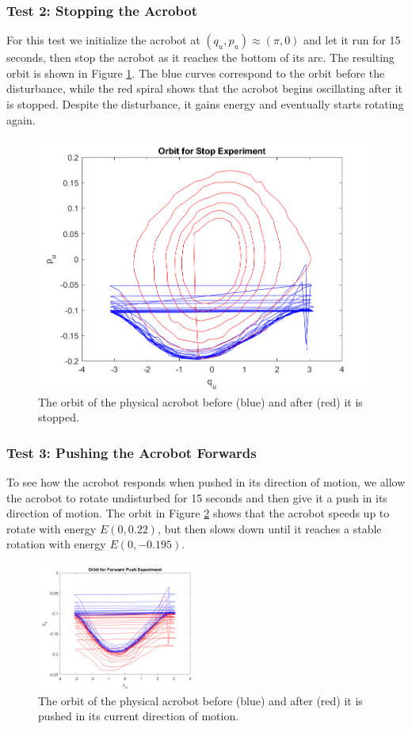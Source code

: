\subsubsection*{Test 2: Stopping the Acrobot}
For this test we initialize the acrobot at 
\((q_u,p_u) \approx \left(\pi,0\right)\) and let it run for 15
seconds, then stop the acrobot as it reaches the bottom of its arc.
The resulting orbit is shown in Figure \ref{fig:acrobot-stopped-orbit}.
The blue curves correspond to the orbit before the disturbance, while the red
spiral shows that the acrobot begins oscillating after it is stopped.
Despite the disturbance, it gains energy and eventually starts rotating
again.

\begin{figure}[ht]
    \centering
    \includegraphics[width=0.5\linewidth]{images/acrobot_stopped_orbit.png}
    \caption{The orbit of the physical acrobot before (blue) and after (red) it
    is stopped.}
    \label{fig:acrobot-stopped-orbit}
\end{figure}

\subsubsection*{Test 3: Pushing the Acrobot Forwards}
To see how the acrobot responds when pushed in its direction of motion, we allow
the acrobot to rotate undisturbed for 15 seconds and then give it a push in its
direction of motion.
The orbit in Figure \ref{fig:acrobot-fpush-orbit} shows that the acrobot speeds
up to rotate with energy \(E(0,0.22)\), but then slows down until it reaches a
stable rotation with energy \(E(0,-0.195)\).

\begin{figure}[ht]
    \centering
    \includegraphics[width=0.5\textwidth]{images/acrobot_fpush_orbit.png}
    \caption{The orbit of the physical acrobot before (blue) and after (red) it
    is pushed in its current direction of motion.}
    \label{fig:acrobot-fpush-orbit}
\end{figure}

